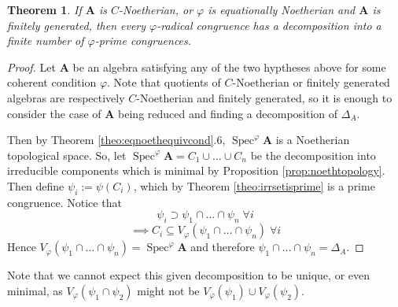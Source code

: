 \documentclass{article}
\theoremstyle{plain}
\newtheorem{theorem}{Theorem}[section]
\theoremstyle{definition}
\newcommand{\Spec}{\operatorname{Spec}}
\begin{document}
\begin{theorem}
    If $\mathbf{A}$ is $C$-Noetherian, or $\varphi$ is equationally Noetherian and $\mathbf{A}$ is finitely generated, then every $\varphi$-radical congruence has a decomposition into a finite number of $\varphi$-prime congruences.
\end{theorem}
\begin{proof}
    Let $\mathbf{A}$ be an algebra satisfying any of the two hyptheses above for some coherent condition $\varphi$.
    Note that quotients of $C$-Noetherian or finitely generated algebras are respectively $C$-Noetherian and finitely generated, so it is enough to consider the case of $\mathbf{A}$ being reduced and finding a decomposition of $\Delta_A$.\par
    Then by Theorem \ref{theo:eqnoethequivcond}.6, $\Spec^\varphi\mathbf{A}$ is a Noetherian topological space.
    So, let $\Spec^\varphi \mathbf{A} = C_1 \cup \dots \cup C_n$ be the decomposition into irreducible components which is minimal by Proposition \ref{prop:noethtopology}.
    Then define $\psi_i := \psi(C_i)$, which by Theorem \ref{theo:irrsetisprime} is a prime congruence.
    Notice that
    $$\psi_i \supset \psi_1 \cap \dots \cap \psi_n \; \forall i$$
    $$\implies C_i \subseteq V_\varphi(\psi_1 \cap \dots \cap \psi_n)\; \forall i$$
    Hence $V_\varphi(\psi_1 \cap \dots \cap \psi_n) = \Spec^\varphi\mathbf{A}$ and therefore $\psi_1 \cap \dots \cap \psi_n = \Delta_A$.
\end{proof}

Note that we cannot expect this given decomposition to be unique, or even minimal, as $V_\varphi(\psi_1 \cap \psi_2)$ might not be $V_\varphi(\psi_1) \cup V_\varphi(\psi_2)$.




\printbibliography 

    
\end{document}
